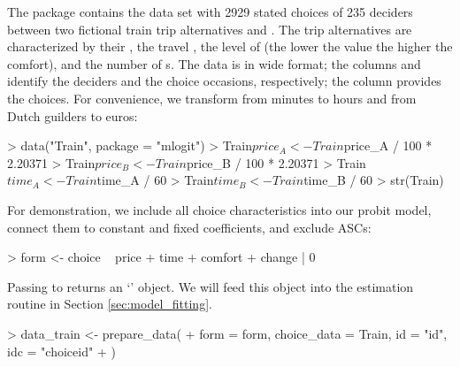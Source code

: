 \documentclass[article,shortnames]{jss}
\newcommand{\class}[1]{`\code{#1}'}
\newcommand{\fct}[1]{\code{#1()}}
\begin{document}
The  package contains the data set  with 2929 stated choices of 235 deciders between two fictional train trip alternatives  and . The trip alternatives are characterized by their , the travel , the level of  (the lower the value the higher the comfort), and the number of s. The data is in wide format; the columns  and  identify the deciders and the choice occasions, respectively; the column  provides the choices. For convenience, we transform  from minutes to hours and  from Dutch guilders to euros:

\begin{Schunk}
\begin{Sinput}
> data("Train", package = "mlogit")
> Train$price_A <- Train$price_A / 100 * 2.20371
> Train$price_B <- Train$price_B / 100 * 2.20371
> Train$time_A <- Train$time_A / 60
> Train$time_B <- Train$time_B / 60
> str(Train)
\end{Sinput}
\end{Schunk}

For demonstration, we include all choice characteristics into our probit model, connect them to constant and fixed coefficients, and exclude ASCs:

\begin{Schunk}
\begin{Sinput}
> form <- choice ~ price + time + comfort + change | 0
\end{Sinput}
\end{Schunk}

Passing  to \fct{prepare\_data} returns an \class{RprobitB\_data} object. We will feed this object into the estimation routine \fct{fit\_model} in Section \ref{sec:model_fitting}.

\begin{Schunk}
\begin{Sinput}
> data_train <- prepare_data(
+    form = form, choice_data = Train, id = "id", idc = "choiceid"
+  )
\end{Sinput}
\end{Schunk}
\end{document}
